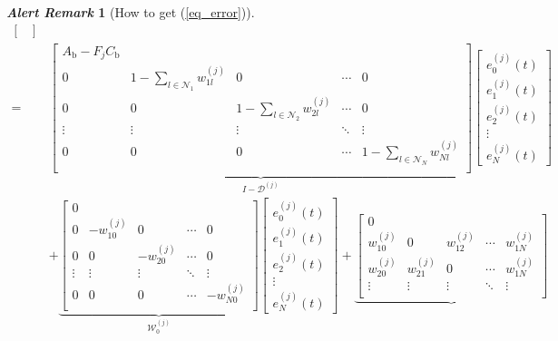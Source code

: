 \documentclass[letterpaper, 10pt, conference]{ieeeconf}  %
\def\eqref#1{(\ref{#1})}
\def\W{\mathcal{W}} %
\newtheorem{alert}{\color{red}\it Alert Remark}
\begin{document}
\begin{figure}[!t]
\begin{alert}[How to get \eqref{eq_error}]
\begin{equation}
\begin{aligned}
\begin{bmatrix}
        \end{bmatrix} \\
        =&\underbrace{\begin{bmatrix}
            A_{\text{b}} - F_{j}C_{\text{b}} \\
            0 & 1-\sum_{l \in \mathcal{N}_1} w_{1l}^{(j)} & 0 & \cdots & 0 \\
            0 & 0 &1-\sum_{l \in \mathcal{N}_2} w_{2l}^{(j)} & \cdots & 0 \\
            \vdots &\vdots & \vdots & \ddots & \vdots \\
            0 & 0 & 0 & \cdots & 1-\sum_{l \in \mathcal{N}_N} w_{Nl}^{(j)} \\
        \end{bmatrix}}_{I - \mathcal{D}^{(j)}}
        \begin{bmatrix}
            e_0^{(j)}(t) \\ e_1^{(j)}(t)  \\ e_2^{(j)}(t)  \\ \vdots \\ e_N^{(j)}(t) 
        \end{bmatrix}\\
        &+\underbrace{\begin{bmatrix}
            0 \\
            0 & - w_{10}^{(j)} & 0 & \cdots & 0 \\
            0 & 0 & - w_{20}^{(j)} & \cdots & 0 \\
            \vdots &\vdots & \vdots & \ddots & \vdots \\
            0 & 0 & 0 & \cdots & - w_{N0}^{(j)} \\
        \end{bmatrix}}_{\W_{0}^{(j)}}
        \begin{bmatrix}
            e_0^{(j)}(t) \\ e_1^{(j)}(t)  \\ e_2^{(j)}(t)  \\ \vdots \\ e_N^{(j)}(t) 
        \end{bmatrix}
        +\underbrace{\begin{bmatrix}
            0 \\
            w_{10}^{(j)} & 0 & w_{12}^{(j)} & \cdots & w_{1N}^{(j)} \\
            w_{20}^{(j)} & w_{21}^{(j)} & 0 & \cdots & w_{1N}^{(j)} \\
            \vdots &\vdots & \vdots & \ddots & \vdots \\

\end{bmatrix}}
\end{aligned}
\end{equation}
\end{alert}
\end{figure}
\end{document}
